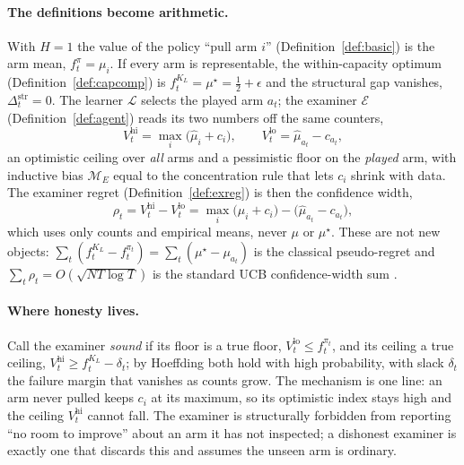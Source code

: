 \documentclass[10pt]{article} %
\theoremstyle{definition}
\theoremstyle{plain}
\newcommand{\ModE}{\mathcal{M}_E}
\newcommand{\Vlow}{V^{\mathrm{lo}}_t}
\newcommand{\Vhi}{V^{\mathrm{hi}}_t}
\newcommand{\Dstruct}{\Delta^{\mathrm{str}}}
\begin{document}
\paragraph{The definitions become arithmetic.} With $H=1$ the value of the policy ``pull arm $i$'' (Definition~\ref{def:basic}) is the arm mean, $f^{\pi}_t=\mu_i$. If every arm is representable, the within-capacity optimum (Definition~\ref{def:capcomp}) is $f^{K_L}_t=\mu^\star=\tfrac12+\epsilon$ and the structural gap vanishes, $\Dstruct_t=0$. The learner $\mathcal{L}$ selects the played arm $a_t$; the examiner $\mathcal{E}$ (Definition~\ref{def:agent}) reads its two numbers off the same counters,
\[
\Vhi=\max_i\big(\hat\mu_i+c_i\big),
\qquad
\Vlow=\hat\mu_{a_t}-c_{a_t},
\]
an optimistic ceiling over \emph{all} arms and a pessimistic floor on the \emph{played} arm, with inductive bias $\ModE$ equal to the concentration rule that lets $c_i$ shrink with data. The examiner regret (Definition~\ref{def:exreg}) is then the confidence width,
\[
\rho_t=\Vhi-\Vlow=\max_i\big(\hat\mu_i+c_i\big)-\big(\hat\mu_{a_t}-c_{a_t}\big),
\]
which uses only counts and empirical means, never $\mu$ or $\mu^\star$. These are not new objects: $\sum_t(f^{K_L}_t-f^{\pi_t}_t)=\sum_t(\mu^\star-\mu_{a_t})$ is the classical pseudo-regret and $\sum_t\rho_t=O(\sqrt{NT\log T})$ is the standard UCB confidence-width sum \citep{auer2002ucb,lai1985asymptotically}.

\paragraph{Where honesty lives.} Call the examiner \emph{sound} if its floor is a true floor, $\Vlow\le f^{\pi_t}_t$, and its ceiling a true ceiling, $\Vhi\ge f^{K_L}_t-\delta_t$; by Hoeffding both hold with high probability, with slack $\delta_t$ the failure margin that vanishes as counts grow. The mechanism is one line: an arm never pulled keeps $c_i$ at its maximum, so its optimistic index stays high and the ceiling $\Vhi$ cannot fall. The examiner is structurally forbidden from reporting ``no room to improve'' about an arm it has not inspected; a dishonest examiner is exactly one that discards this and assumes the unseen arm is ordinary.
\end{document}
